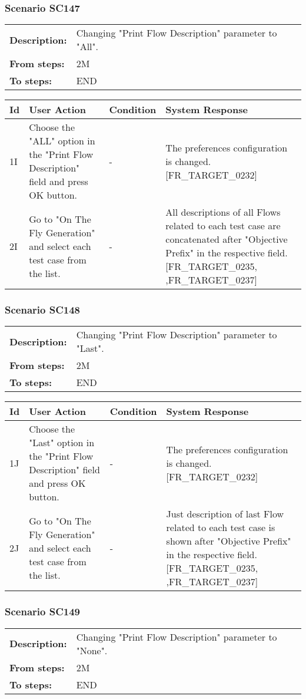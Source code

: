 \documentclass[a4paper,11pt]{article}
\newcommand{\bl}{\\ \hline}
\begin{document}
\subsubsection*{Scenario SC147}
\begin{tabular}{p{1in}p{4in}}
{\bf Description:} & Changing "Print Flow Description" parameter to "All".
				 \\
{\bf From steps:} & 2M \\
{\bf To steps:} & END \\
\end{tabular}
 
\begin{tabular}{|p{0.8in}|p{1.6in}|p{1.6in}|p{1.6in}|}
\hline
Id & User Action & Condition & System Response  \bl 
1I & Choose the "ALL" option in the "Print Flow Description"
						field and press OK button. & - & The preferences configuration is changed.
						[FR_TARGET_0232] \bl 
2I & Go to "On The Fly Generation" and select each test case
						from the list. & - & All descriptions of all Flows related to each test case
						are concatenated after "Objective Prefix" in the respective field.
						[FR_TARGET_0235, ,FR_TARGET_0237] \bl 
\end{tabular}
\subsubsection*{Scenario SC148}
\begin{tabular}{p{1in}p{4in}}
{\bf Description:} & Changing "Print Flow Description" parameter to "Last".
				 \\
{\bf From steps:} & 2M \\
{\bf To steps:} & END \\
\end{tabular}
 
\begin{tabular}{|p{0.8in}|p{1.6in}|p{1.6in}|p{1.6in}|}
\hline
Id & User Action & Condition & System Response  \bl 
1J & Choose the "Last" option in the "Print Flow Description"
						field and press OK button. & - & The preferences configuration is changed.
						[FR_TARGET_0232] \bl 
2J & Go to "On The Fly Generation" and select each test case
						from the list. & - & Just description of last Flow related to each test case
						is shown after "Objective Prefix" in the respective field.
						[FR_TARGET_0235, ,FR_TARGET_0237] \bl 
\end{tabular}
\subsubsection*{Scenario SC149}
\begin{tabular}{p{1in}p{4in}}
{\bf Description:} & Changing "Print Flow Description" parameter to "None".
				 \\
{\bf From steps:} & 2M \\
{\bf To steps:} & END \\
\end{tabular}
 
\end{document}
